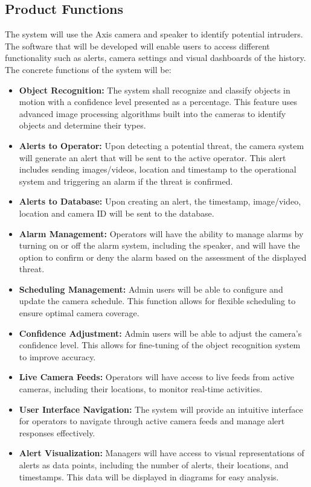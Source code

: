 \documentclass{article}
\begin{document}
\subsection{Product Functions}
The system will use the Axis camera and speaker to identify potential intruders. The software that will be developed will enable users to access different functionality such as alerts, camera settings and visual dashboards of the history. The concrete functions of the system will be: 

\begin{itemize}
    \item \textbf{Object Recognition:} The system shall recognize and classify objects in motion with a confidence level presented as a percentage. This feature uses advanced image processing algorithms built into the cameras to identify objects and determine their types.
    \item \textbf{Alerts to Operator:} Upon detecting a potential threat, the camera system will generate an alert that will be sent to the active operator. This alert includes sending images/videos, location and timestamp to the operational system and triggering an alarm if the threat is confirmed.
    \item \textbf{Alerts to Database:} Upon creating an alert, the timestamp, image/video, location and camera ID will be sent to the database.
    \item \textbf{Alarm Management:} Operators will have the ability to manage alarms by turning on or off the alarm system, including the speaker, and will have the option to confirm or deny the alarm based on the assessment of the displayed threat.
    \item \textbf{Scheduling Management:} Admin users will be able to configure and update the camera schedule. This function allows for flexible scheduling to ensure optimal camera coverage.
    \item \textbf{Confidence Adjustment:} Admin users will be able to adjust the camera’s confidence level. This allows for fine-tuning of the object recognition system to improve accuracy.
    \item \textbf{Live Camera Feeds:} Operators will have access to live feeds from active cameras, including their locations, to monitor real-time activities.
    \item \textbf{User Interface Navigation:} The system will provide an intuitive interface for operators to navigate through active camera feeds and manage alert responses effectively.
    \item \textbf{Alert Visualization:} Managers will have access to visual representations of alerts as data points, including the number of alerts, their locations, and timestamps. This data will be displayed in diagrams for easy analysis.

\end{itemize}
\end{document}
